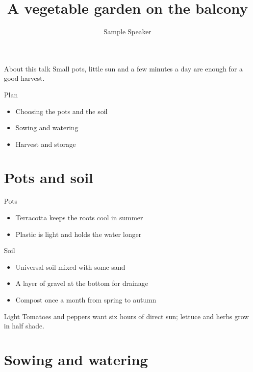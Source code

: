 \documentclass[aspectratio=169]{beamer}
\title{A vegetable garden on the balcony}
\author{Sample Speaker}
\date{}
\begin{document}
\begin{frame}
  \titlepage
\end{frame}

\begin{frame}{About this talk}
  Small pots, little sun and a few minutes a day are enough for a good harvest.
\end{frame}

\begin{frame}{Plan}
  \begin{itemize}
    \item Choosing the pots and the soil
    \item Sowing and watering
    \item Harvest and storage
  \end{itemize}
\end{frame}

\section{Pots and soil}

\begin{frame}{Pots}
  \begin{itemize}
    \item<1-> Terracotta keeps the roots cool in summer
    \item<2-> Plastic is light and holds the water longer
  \end{itemize}
\end{frame}

\begin{frame}{Soil}
  \begin{itemize}
    \item<1-> Universal soil mixed with some sand
    \item<2-> A layer of gravel at the bottom for drainage
    \item<3-> Compost once a month from spring to autumn
  \end{itemize}
\end{frame}

\begin{frame}{Light}
  Tomatoes and peppers want six hours of direct sun; lettuce and herbs grow in half shade.
\end{frame}

\section{Sowing and watering}
\end{document}

